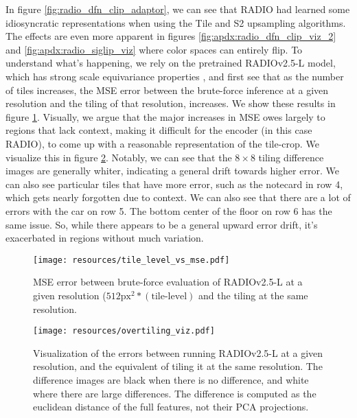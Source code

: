 In figure \ref{fig:radio_dfn_clip_adaptor}, we can see that RADIO had learned some idiosyncratic representations when using the Tile and S2 upsampling algorithms. The effects are even more apparent in figures \ref{fig:apdx:radio_dfn_clip_viz_2} and \ref{fig:apdx:radio_siglip_viz} where color spaces can entirely flip. To understand what's happening, we rely on the pretrained RADIOv2.5-L model, which has strong scale equivariance properties \cite{heinrich2024radioamplifiedimprovedbaselines}, and first see that as the number of tiles increases, the MSE error between the brute-force inference at a given resolution and the tiling of that resolution, increases. We show these results in figure \ref{fig:tile_level_vs_mse}. Visually, we argue that the major increases in MSE owes largely to regions that lack context, making it difficult for the encoder (in this case RADIO), to come up with a reasonable representation of the tile-crop. We visualize this in figure \ref{fig:overtiling_viz}. Notably, we can see that the $8\times8$ tiling difference images are generally whiter, indicating a general drift towards higher error. We can also see particular tiles that have more error, such as the notecard in row 4, which gets nearly forgotten due to context. We can also see that there are a lot of errors with the car on row 5. The bottom center of the floor on row 6 has the same issue. So, while there appears to be a general upward error drift, it's exacerbated in regions without much variation.

\begin{figure}[h]
    \centering
    \texttt{[image: resources/tile\_level\_vs\_mse.pdf]}
    \caption{MSE error between brute-force evaluation of RADIOv2.5-L at a given resolution ($512\text{px}^2*(\text{tile-level})$ and the tiling at the same resolution.}
    \label{fig:tile_level_vs_mse}
\end{figure}

\begin{figure}
    \centering
    \texttt{[image: resources/overtiling\_viz.pdf]}
    \caption{Visualization of the errors between running RADIOv2.5-L at a given resolution, and the equivalent of tiling it at the same resolution. The difference images are black when there is no difference, and white where there are large differences. The difference is computed as the euclidean distance of the full features, not their PCA projections.}
    \label{fig:overtiling_viz}
\end{figure}

